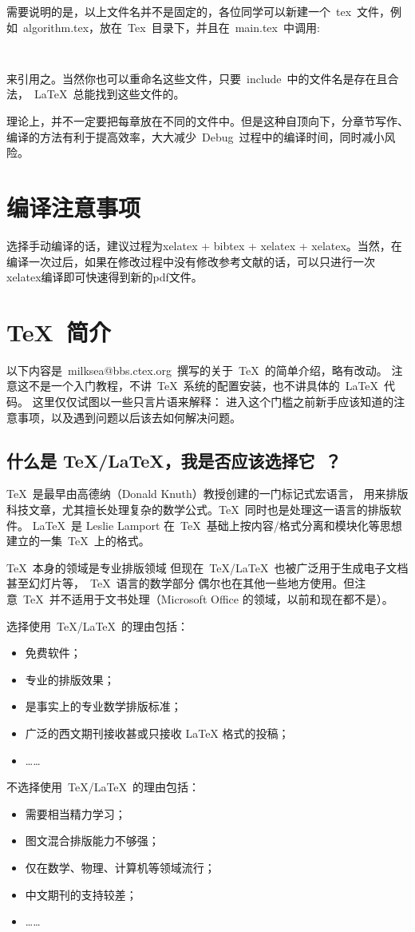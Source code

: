 需要说明的是，以上文件名并不是固定的，各位同学可以新建一个~tex~文件，例如~algorithm.tex，放在~Tex~目录下，并且在~main.tex~中调用:
\begin{verbatim}
    
\end{verbatim}
来引用之。当然你也可以重命名这些文件，只要~include~中的文件名是存在且合法，~\LaTeX~总能找到这些文件的。

理论上，并不一定要把每章放在不同的文件中。但是这种自顶向下，分章节写作、编译的方法有利于提高效率，大大减少~Debug~过程中的编译时间，同时减小风险。


\section{编译注意事项}
选择手动编译的话，建议过程为xelatex + bibtex + xelatex + xelatex。当然，在编译一次过后，如果在修改过程中没有修改参考文献的话，可以只进行一次xelatex编译即可快速得到新的pdf文件。



\section{\TeX~简介}

以下内容是~milksea@bbs.ctex.org~撰写的关于~\TeX~的简单介绍，略有改动。
注意这不是一个入门教程，不讲~\TeX~系统的配置安装，也不讲具体的~\LaTeX~代码。
这里仅仅试图以一些只言片语来解释：
进入这个门槛之前新手应该知道的注意事项，以及遇到问题以后该去如何解决问题。

\subsection{什么是 \TeX/\LaTeX，我是否应该选择它~？}

\TeX~是最早由高德纳（Donald Knuth）教授创建的一门标记式宏语言，\cite{ahern1995greenways}
用来排版科技文章，尤其擅长处理复杂的数学公式。\TeX~同时也是处理这一语言的排版软件。
\LaTeX~是 Leslie Lamport 在~\TeX~基础上按内容/格式分离和模块化等思想建立的一集~\TeX~上的格式。

\TeX~本身的领域是专业排版领域
但现在~TeX/LaTeX~也被广泛用于生成电子文档甚至幻灯片等，~\TeX~语言的数学部分
偶尔也在其他一些地方使用。但注意~\TeX~并不适用于文书处理（Microsoft Office 的领域，以前和现在都不是）。

选择使用~\TeX/\LaTeX~的理由包括：
\begin{itemize}
\item 免费软件；
\item 专业的排版效果；
\item 是事实上的专业数学排版标准；
\item 广泛的西文期刊接收甚或只接收 LaTeX 格式的投稿；
\item[] ……
\end{itemize}
不选择使用~\TeX/\LaTeX~的理由包括：
\begin{itemize}
\item 需要相当精力学习；
\item 图文混合排版能力不够强；
\item 仅在数学、物理、计算机等领域流行；
\item 中文期刊的支持较差；
\item[] ……
\end{itemize}

